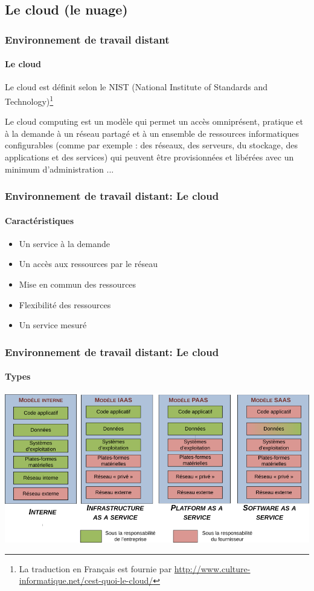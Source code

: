 \documentclass[xcolor=table]{beamer}
\begin{document}
\subsection{Le cloud (le nuage)}

\begin{frame}
\frametitle{Environnement de travail distant}
\framesubtitle{Le cloud}

Le cloud est définit selon le NIST (National Institute of Standards and Technology)\footnote{La traduction en Français est fournie par \url{http://www.culture-informatique.net/cest-quoi-le-cloud/}}
\begin{definition}
	Le cloud computing est un modèle qui permet un accès omniprésent, pratique et à la demande à un réseau partagé et à un ensemble de ressources informatiques configurables (comme par exemple : des réseaux, des serveurs, du stockage, des applications et des services) qui peuvent être provisionnées et libérées avec un minimum d’administration ...
\end{definition}

\end{frame}

\begin{frame}
\frametitle{Environnement de travail distant: Le cloud}
\framesubtitle{Caractéristiques}

\begin{itemize}
	\item Un service à la demande
	\item Un accès aux ressources par le réseau
	\item Mise en commun des ressources
	\item Flexibilité des ressources
	\item Un service mesuré
\end{itemize}


\end{frame}


\begin{frame}
\frametitle{Environnement de travail distant: Le cloud}
\framesubtitle{Types}

\includegraphics[width=
\textwidth]{../img/Bweb01-environnement/cloud-types.png}


\end{frame}
\end{document}
